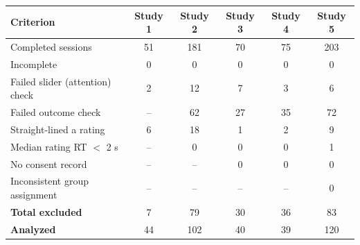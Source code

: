 \begin{tabular}{lccccc}
\toprule
Criterion & Study 1 & Study 2 & Study 3 & Study 4 & Study 5 \\
\midrule
Completed sessions & 51 & 181 & 70 & 75 & 203 \\
Incomplete & 0 & 0 & 0 & 0 & 0 \\
Failed slider (attention) check & 2 & 12 & 7 & 3 & 6 \\
Failed outcome check & -- & 62 & 27 & 35 & 72 \\
Straight-lined a rating & 6 & 18 & 1 & 2 & 9 \\
Median rating RT $<$ 2 s & -- & 0 & 0 & 0 & 1 \\
No consent record & -- & -- & 0 & 0 & 0 \\
Inconsistent group assignment & -- & -- & -- & -- & 0 \\ \midrule
\textbf{Total excluded} & 7 & 79 & 30 & 36 & 83 \\
\textbf{Analyzed} & 44 & 102 & 40 & 39 & 120 \\
\bottomrule
\end{tabular}

